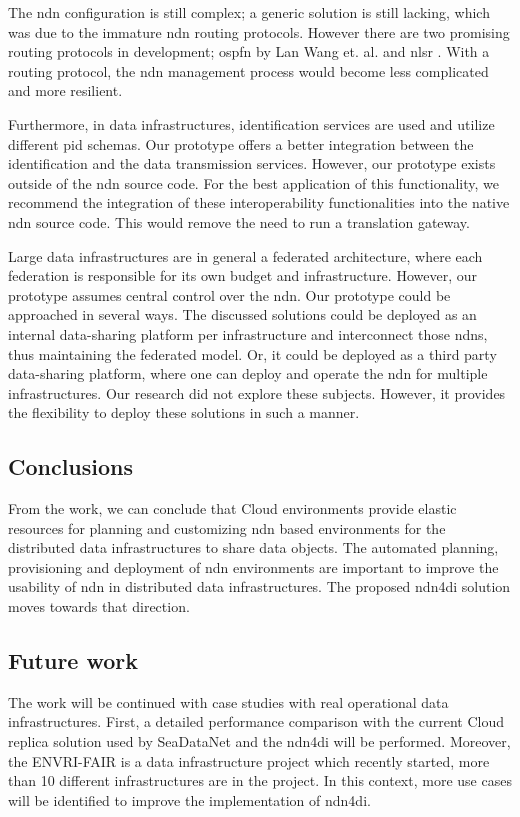 \documentclass[conference]{IEEEtran}
\begin{document}
The \gls{ndn} configuration is still complex; a generic solution is still lacking, which was due to the immature \gls{ndn} routing protocols. However there are two promising routing protocols in development; \gls{ospfn} by Lan Wang et. al. \cite{ndn-ospfn2} and \gls{nlsr} \cite{nlsr}. With a routing protocol, the \gls{ndn} management process would become less complicated and more resilient.

Furthermore, in data infrastructures, identification services are used and utilize different \gls{pid} schemas. Our prototype offers a better integration between the identification and the data transmission services. However, our prototype exists outside of the \gls{ndn} source code. For the best application of this functionality, we recommend the integration of these interoperability functionalities into the native \gls{ndn} source code. This would remove the need to run a translation gateway.

Large data infrastructures are in general a federated architecture, where each federation is responsible for its own budget and infrastructure. However, our prototype assumes central control over the \gls{ndn}. Our prototype could be approached in several ways. The discussed solutions could be deployed as an internal data-sharing platform per infrastructure and interconnect those \glspl{ndn}, thus maintaining the federated model. Or, it could be deployed as a third party data-sharing platform, where one can deploy and operate the \gls{ndn} for multiple infrastructures. Our research did not explore these subjects. However, it provides the flexibility to deploy these solutions in such a manner.

\subsection{Conclusions}
From the work, we can conclude that Cloud environments provide elastic resources for planning and customizing \gls{ndn} based environments for the distributed data infrastructures to share data objects. The automated planning, provisioning and deployment of \gls{ndn} environments are important to improve the usability of \gls{ndn} in distributed data infrastructures. The proposed \gls{ndn4di} solution moves towards that direction. 

\subsection{Future work}
The work will be continued with case studies with real operational data infrastructures. First, a detailed performance comparison with the current Cloud replica solution used by SeaDataNet and the \gls{ndn4di} will be performed. Moreover, the ENVRI-FAIR is a data infrastructure project which recently started, more than 10 different infrastructures are in the project. In this context, more use cases will be identified to improve the implementation of \gls{ndn4di}.  
\end{document}
